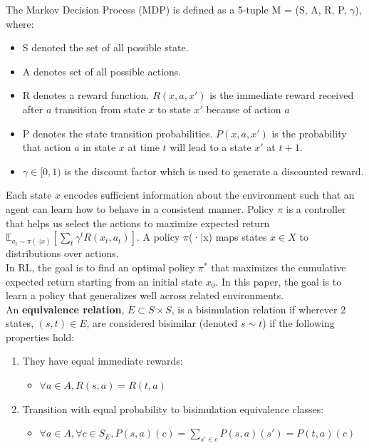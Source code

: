 \documentclass{usiinftr}
\begin{document}
The Markov Decision Process (MDP) is defined as a 5-tuple M = (S, A, R, P, $\gamma$), where:
\begin{itemize}
    \item S denoted the set of all possible state.
    \item A denotes set of all possible actions.
    \item R denotes a reward function. $R(x,a,x')$ is the immediate reward received after $a$ transition from state $x$ to state $x'$ because of action $a$
    \item P denotes the state transition probabilities. $P(x,a,x')$ is the probability that action $a$ in state $x$ at time $t$ will lead to a state $x'$ at $t+1$.
    \item $\gamma \in  [0, 1)$  is the discount factor which is used to generate a discounted reward. \cite{puterman2005markov}
\end{itemize}

Each state $x$ encodes sufficient information about the environment such that an agent can learn how to behave in a consistent manner. Policy $\pi$ is a controller that helps us select the actions to maximize expected return $\mathbb{E}_{a_{t}\sim \pi(\cdot|x)} [\sum_t \gamma^t R(x_t,a_t)]$. A policy $\pi$(·$|$x) maps states $x \in X$ to distributions over actions. \\

In RL, the goal is to find an optimal policy $\pi^*$ that maximizes the cumulative expected return starting from an initial state $x_0$. In this paper, the goal is to learn a policy that generalizes well across related environments. \cite{agarwal2021contrastive}
 \\

An \textbf{equivalence relation}, $E \subset S \times S$, is a bisimulation relation if wherever 2 states, $(s,t) \in E$, are considered bisimilar (denoted $s \sim t$) if the following properties hold:

\begin{enumerate}
    \item They have equal immediate rewards: 
    \begin{itemize}
        \item $\forall a \in A, R(s,a) = R(t,a)$
    \end{itemize}
    \item Transition with equal probability to bisimulation equivalence classes:
    \begin{itemize}
        \item $\forall a \in A, \forall c \in S_E, P(s,a)(c) = \sum_{s'\in c} P(s,a)(s') = P(t,a)(c)$ \cite{castro2020scalable}
    \end{itemize}
\end{enumerate}
\end{document}
